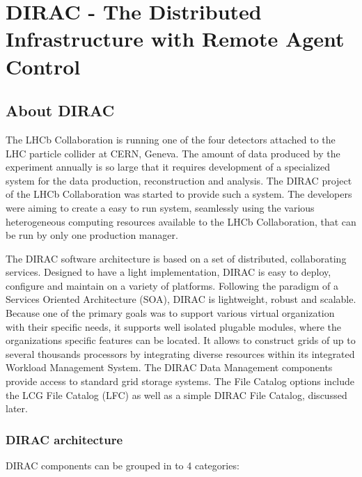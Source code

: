 \chapter{DIRAC - The Distributed Infrastructure with Remote Agent Control}

\section{About DIRAC}
The LHCb Collaboration\cite{LHCb} is running one of the four detectors attached to the LHC particle 
collider at CERN, Geneva. The amount of data produced by the experiment
annually is so large that it requires development of a specialized system for the data
production, reconstruction and analysis. The DIRAC project of the LHCb Collaboration was started to
provide such a system.\cite{Dir2} The developers were aiming to create a easy to run system, seamlessly using 
the various heterogeneous computing resources available to the LHCb Collaboration, that can be run by only one 
production manager. 

The DIRAC software architecture is based on a set of distributed, collaborating services. Designed to have a
light implementation, DIRAC is easy to deploy, configure and maintain on a variety of platforms. Following
the paradigm of a Services Oriented Architecture (SOA), DIRAC is lightweight, robust and scalable. Because one 
of the primary goals was to support various virtual organization with their specific needs, it supports well 
isolated plugable modules, where the organizations specific features can be located. It allows to construct
grids of up to several thousands processors by integrating diverse resources within its integrated Workload
Management System. The DIRAC Data Management components provide access to standard grid storage systems. 
The File Catalog options include the LCG File Catalog (LFC) as well as a simple DIRAC 
File Catalog, discussed later. 

\subsection{DIRAC architecture}
DIRAC components can be grouped in to 4 categories: 


